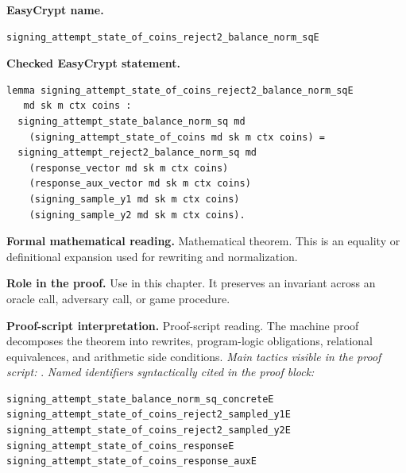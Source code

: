 \begin{formaltheorem}
\noindent\textbf{EasyCrypt name.}
\begin{lstlisting}[language=EasyCrypt,basicstyle=\ttfamily\scriptsize]
signing_attempt_state_of_coins_reject2_balance_norm_sqE
\end{lstlisting}
\noindent\textbf{Checked EasyCrypt statement.}
\begin{lstlisting}[language=EasyCrypt,basicstyle=\ttfamily\scriptsize]
lemma signing_attempt_state_of_coins_reject2_balance_norm_sqE
   md sk m ctx coins :
  signing_attempt_state_balance_norm_sq md
    (signing_attempt_state_of_coins md sk m ctx coins) =
  signing_attempt_reject2_balance_norm_sq md
    (response_vector md sk m ctx coins)
    (response_aux_vector md sk m ctx coins)
    (signing_sample_y1 md sk m ctx coins)
    (signing_sample_y2 md sk m ctx coins).
\end{lstlisting}
\noindent\textbf{Formal mathematical reading.}
Mathematical theorem. This is an equality or definitional expansion used for rewriting and normalization.

\noindent\textbf{Role in the proof.}
Use in this chapter. It preserves an invariant across an oracle call, adversary call, or game procedure.

\noindent\textbf{Proof-script interpretation.}
Proof-script reading. The machine proof decomposes the theorem into rewrites, program-logic obligations, relational equivalences, and arithmetic side conditions.
\emph{Main tactics visible in the proof script:} .
\emph{Named identifiers syntactically cited in the proof block:}
\begin{lstlisting}[language=EasyCrypt,basicstyle=\ttfamily\scriptsize]
signing_attempt_state_balance_norm_sq_concreteE
signing_attempt_state_of_coins_reject2_sampled_y1E
signing_attempt_state_of_coins_reject2_sampled_y2E
signing_attempt_state_of_coins_responseE
signing_attempt_state_of_coins_response_auxE
\end{lstlisting}

\end{formaltheorem}

